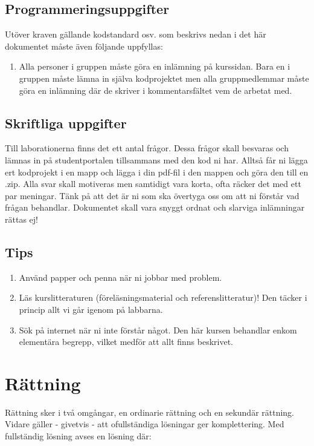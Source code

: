 \documentclass{article}
\begin{document}
  \subsection*{Programmeringsuppgifter}
  Utöver kraven gällande kodstandard osv. som beskrivs nedan i det här dokumentet måste
  även följande uppfyllas:
  
  \begin{enumerate}
    \item Alla personer i gruppen måste göra en inlämning på kurssidan. Bara en i gruppen
    måste lämna in själva kodprojektet men alla gruppmedlemmar måste göra en inlämning
    där de skriver i kommentarsfältet vem de arbetat med.
  \end{enumerate}
  
  \subsection*{Skriftliga uppgifter}
  Till laborationerna finns det ett antal frågor. Dessa frågor skall besvaras och lämnas in på studentportalen tillsammans med den kod ni har. Alltså får ni lägga ert kodprojekt i en mapp och lägga i din pdf-fil i den mappen och göra den till en .zip. Alla svar skall motiveras men samtidigt vara korta, ofta räcker det med ett par meningar. Tänk på att det är ni som ska övertyga oss om att ni förstår vad frågan behandlar. Dokumentet skall vara snyggt ordnat och slarviga inlämningar rättas ej! 
  
  \subsection*{Tips}
  \begin{enumerate}
  		\item Använd papper och penna när ni jobbar med problem.
  		\item Läs kurslitteraturen (föreläsningsmaterial och referenslitteratur)! Den täcker i princip
  		allt vi går igenom på labbarna.
  		\item Sök på internet när ni inte förstår något. Den här kursen behandlar enkom elementära
  		begrepp, vilket medför att allt finns beskrivet.
  \end{enumerate}
  \section*{Rättning}
  Rättning sker i två omgångar, en ordinarie rättning och en sekundär rättning. Vidare gäller - givetvis - att ofullständiga lösningar ger komplettering. Med fullständig lösning avses en
  lösning där:
  
\end{document}

